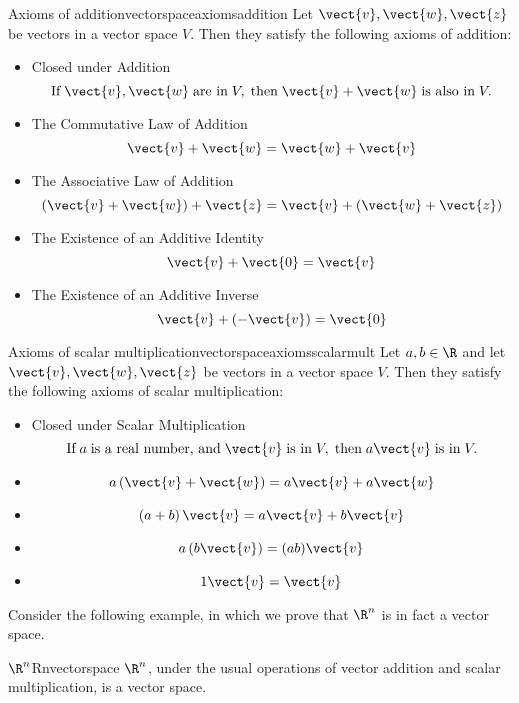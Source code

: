 \begin{definition}{Axioms of addition}{vectorspaceaxiomsaddition}
Let $\vect{v}, \vect{w}, \vect{z}$ be vectors in a vector space $V$. Then they satisfy the following axioms of addition:

\begin{itemize}
\item Closed under Addition
\[ \mbox{If}\; \vect{v}, \vect{w} \;\mbox{are in}\; V, \;\mbox{then}\; \vect{v}+\vect{w} \;\mbox{is also in}\; V.
\] 
\item The Commutative Law of Addition
\[
\vect{v}+\vect{w}=\vect{w}+\vect{v}
\]
\item The Associative Law of Addition
\[
\left( \vect{v}+\vect{w}\right) +\vect{z}=\vect{v}+\left( \vect{w}+
\vect{z}\right) 
\]
\item The Existence of an Additive Identity
\[
\vect{v}+\vect{0}=\vect{v}
\]
\item The Existence of an Additive Inverse
\[
\vect{v}+\left( -\vect{v}\right) =\vect{0}
\]
\end{itemize}
\end{definition}

\begin{definition}{Axioms of scalar multiplication}{vectorspaceaxiomsscalarmult}
Let $a, b \in \R$ and let $\vect{v}, \vect{w}, \vect{z}$ be vectors in a vector space $V$. Then they satisfy the following axioms of scalar multiplication:

\begin{itemize}
\item Closed under Scalar Multiplication
\[ \mbox{If}\; a \;\mbox{is a real number, and}\; \vect{v} \;\mbox{is in}\; V, \;\mbox{then}\; a\vect{v} \;\mbox{is in}\; V.
\]
\item
\[
a \left( \vect{v}+\vect{w}\right) = a \vect{v}+ a \vect{w}  \label{e.01}
\]
\item
\[
\left( a + b \right) \vect{v}= a \vect{v}+ b \vect{v}
\label{e.02}
\]
\item
\[
a \left( b \vect{v}\right) = (a b) \vect{v}
\label{e.03}
\]
\item
\[
1\vect{v}=\vect{v}  \label{e.04}
\]
\end{itemize}
\end{definition}

Consider the following example, in which we prove that $\R^n$ is in fact a vector space.

\begin{example}{$\R^n$}{Rnvectorspace}
$\R^n$, under the usual operations of vector addition and scalar multiplication, is a vector space.
\end{example}

